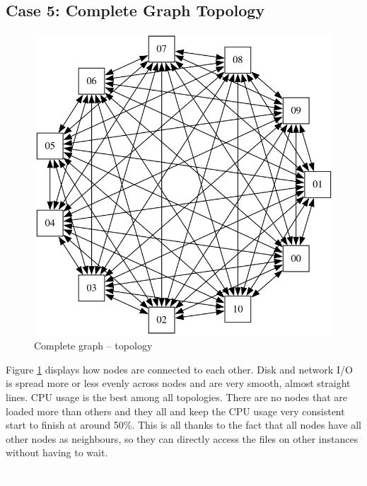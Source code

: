 \newpage
\subsection{Case 5: Complete Graph Topology}

\begin{figure}
\centering
\captionsetup{justification=centering,width=0.8\linewidth}
\includegraphics[width=0.7\linewidth]{figures/topologies/graph-complete.png}
\caption{Complete graph -- topology}
\label{fig:graph-complete-topology}
\end{figure}

Figure \ref{fig:graph-complete-topology} displays how nodes are connected to
each other. Disk and network I/O is spread more or less evenly across nodes and
are very smooth, almost straight lines. CPU usage is the best among all
topologies. There are no nodes that are loaded more than others and they all
and keep the CPU usage very consistent start to finish at around 50\%. This is
all thanks to the fact that all nodes have all other nodes as neighbours, so
they can directly access the files on other instances without having to wait.

\textcolor{white}{.}\\\\\\\\\\\\

